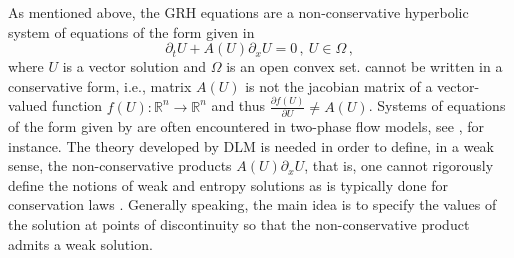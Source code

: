 \documentclass[times,doublespace]{fldauth}%
\begin{document}
As mentioned above, the GRH equations are a  non-conservative hyperbolic system of equations of the form given in  
%
\begin{equation}\label{eq:nc-syst-eq}
\partial_t U + A(U) \partial_x U = 0 \, ,\ U \in \Omega \,,
\end{equation}
%
where $U$ is a vector solution and $\Omega$ is an open convex set.  cannot be written in a conservative form, i.e., matrix $A(U)$ is not the jacobian matrix of a vector-valued function $f(U): \mathbb{R}^n \to \mathbb{R}^n$ and thus $\frac{\partial f(U)}{\partial U} \ne A(U)$.  
Systems of equations of the form given by   are often encountered in two-phase flow models, see 
\cite{Saurel_2009, Ambroso_2012, Zein_2010, Li_2004, Saurel_2001b, Saurel_2001a, GuillardMurrone2003}, for instance. 
The theory developed by DLM \cite{dlm} is needed in order to define, in a weak sense, the non-conservative products $A(U) \partial_x U$,
that is, one cannot rigorously define the notions of weak and entropy solutions as is typically done for 
conservation laws \cite{Lax}. 
Generally speaking, the main idea is to specify the values of the solution at points of discontinuity so that the non-conservative product admits a weak solution.
%
\end{document}
